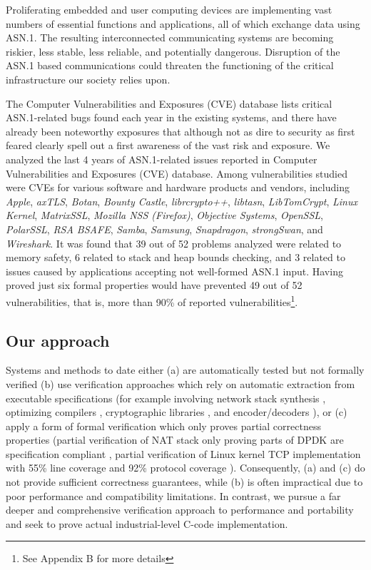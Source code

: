 \documentclass[acmsmall,nonacm]{acmart}
\begin{document}
Proliferating embedded and user computing devices are implementing
vast numbers of essential functions and applications, all of which
exchange data using ASN.1. The resulting interconnected communicating
systems are becoming riskier, less stable, less reliable, and
potentially dangerous. Disruption of the ASN.1 based communications
could threaten the functioning of the critical infrastructure our
society relies upon.


The Computer Vulnerabilities and Exposures (CVE) database \cite{CVE}
lists critical ASN.1-related bugs found each year in the existing
systems, and there have already been noteworthy exposures
\cite{OpenSSLMemoryCorruption} that although not as dire to security
as first feared \cite{ASN1Flaw} clearly spell out a first awareness of
the vast risk and exposure. We analyzed the last 4 years of
ASN.1-related issues reported in Computer Vulnerabilities and
Exposures (CVE) database. %
Among vulnerabilities studied
were CVEs for various software and hardware products and vendors,
including \textit{Apple}, \textit{axTLS}, \textit{Botan},
\textit{Bounty Castle}, \textit{librcrypto++}, \textit{libtasn},
\textit{LibTomCrypt}, \textit{Linux Kernel}, \textit{MatrixSSL},
\textit{Mozilla NSS (Firefox)}, \textit{Objective Systems},
\textit{OpenSSL}, \textit{PolarSSL}, \textit{RSA BSAFE},
\textit{Samba}, \textit{Samsung}, \textit{Snapdragon},
\textit{strongSwan}, and \textit{Wireshark}. It was found that 39 out
of 52 problems analyzed were related to memory safety, 6 related to
stack and heap bounds checking, and 3 related to issues caused by
applications accepting not well-formed ASN.1 input. Having proved just
six formal properties would have prevented 49 out of 52
vulnerabilities, that is, more than 90\% of reported
vulnerabilities\footnote{See Appendix B for more details}.

\subsection{Our approach}
\label{sec:approach}
Systems and methods to date either (a) are automatically tested but not
formally verified (b) use verification approaches which rely on
automatic extraction from executable specifications (for example
involving network stack synthesis \cite{VNSSforSel4}, optimizing compilers
\cite{CompCert}, cryptographic libraries \cite{HACL}, and
encoder/decoders \cite{Narcissus}), or (c) apply a form of formal
verification which only proves partial correctness properties (partial
verification of NAT stack only proving parts of DPDK are specification
compliant \cite{NAT}, partial verification of Linux kernel TCP
implementation with 55\% line coverage and 92\% protocol coverage
\cite{NSDI}). Consequently, (a) and (c) do not provide sufficient
correctness guarantees, while (b) is often impractical due to poor
performance and compatibility limitations. In contrast, we pursue a
far deeper and comprehensive verification approach to performance and
portability and seek to prove actual industrial-level C-code
implementation.
\end{document}
